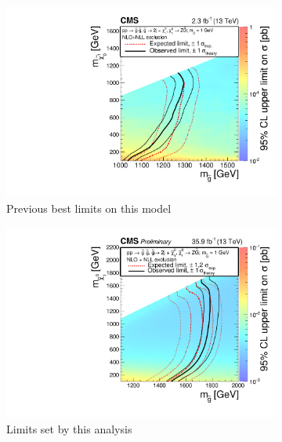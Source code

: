     \begin{figure}[!h]
      \centering
        \begin{subfigure}[b]{0.4\textwidth}
          \label{fig:t5zz_interpretations_2015}
          \includegraphics[width=\textwidth]{figures/interpretations/t5zz_2015_exclusion.pdf}
          \caption{Previous best limits on this model}
        \end{subfigure}
        \begin{subfigure}[b]{0.4\textwidth}
          \label{fig:t5zz_interpretations_current}
          \includegraphics[width=\textwidth]{figures/interpretations/T5ZZ_Exclusion_13TeV.pdf}
          \caption{Limits set by this analysis}
        \end{subfigure}
      \caption{ \label{fig:t5zz_interpretation}
}
\end{figure}
